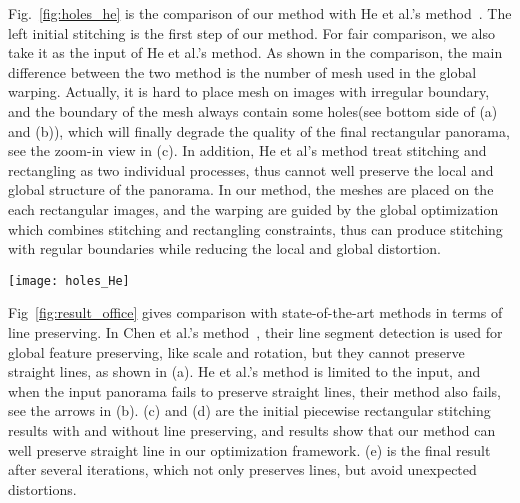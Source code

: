 \documentclass[10pt,journal,compsoc]{IEEEtran}
\begin{document}
Fig.~\ref{fig:holes_he} is the comparison of our method with He et al.'s method~\cite{journals/tog/HeC013}. The left initial stitching is the first step of our method. For fair comparison, we also take it as the input of He et al.'s method. As shown in the comparison, the main difference between the two method is the number of mesh used in the global warping.
Actually, it is hard to place mesh on images with irregular boundary, and the boundary of the mesh always contain some holes(see bottom side of (a) and (b)), which will finally degrade the quality of the final rectangular panorama, see the zoom-in view in (c). In addition, He et al's method treat stitching and rectangling as two individual processes, thus cannot well preserve the local and global structure of the panorama. In our method, the meshes are placed on the each rectangular images, and the warping are guided by the global optimization which combines stitching and rectangling constraints, thus can produce stitching with regular boundaries while reducing the local and global distortion.

 \begin{figure*} %
  \centering
  \texttt{[image: holes\_He]}
  \caption{Comparison with He et al.'s method~\cite{journals/tog/HeC013}. The initial stitching is the first step of our method, which is also the input of He et al.'s method~\cite{journals/tog/HeC013}. For He et al.'s method: (a) mesh of on the input image; (b) mesh after global warping; (c) final rectangular panorama.
  For our method: (d) meshes of our initial stitching; (e) meshes after the global warping; (f) our rectangular panorama.} \label{fig:holes_he}
\end{figure*}

Fig~\ref{fig:result_office} gives comparison with state-of-the-art methods in terms of line preserving. In Chen et al.'s method~\cite{conf/eccv/ChenC16}, their line segment detection is used for global feature preserving, like scale and rotation, but they cannot preserve straight lines, as shown in (a). He et al.'s method is limited to the input, and when the input panorama fails to preserve straight lines, their method also fails, see the arrows in (b). (c) and (d) are the initial piecewise rectangular stitching results with and without line preserving, and results show that our method can well preserve straight line in our optimization framework. (e) is the final result after several iterations, which not only preserves lines, but avoid unexpected distortions.
\end{document}
